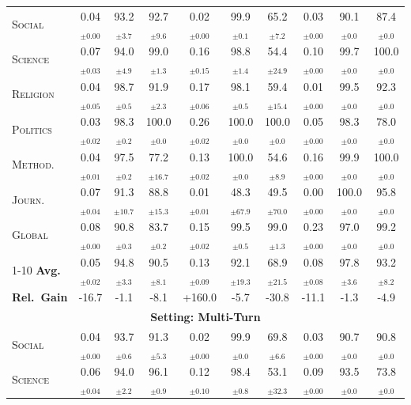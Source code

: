 \begin{table}[!t]
\begin{tabular}{l ccc ccc ccc}
\midrule
\textsc{Social} & 0.04$_{\pm 0.00}$ & 93.2$_{\pm 3.7}$ & 92.7$_{\pm 9.6}$ & 0.02$_{\pm 0.00}$ & 99.9$_{\pm 0.1}$ & 65.2$_{\pm 7.2}$ & 0.03$_{\pm 0.00}$ & 90.1$_{\pm 0.0}$ & 87.4$_{\pm 0.0}$ \\
\textsc{Science} & 0.07$_{\pm 0.03}$ & 94.0$_{\pm 4.9}$ & 99.0$_{\pm 1.3}$ & 0.16$_{\pm 0.15}$ & 98.8$_{\pm 1.4}$ & 54.4$_{\pm 24.9}$ & 0.10$_{\pm 0.00}$ & 99.7$_{\pm 0.0}$ & 100.0$_{\pm 0.0}$ \\
\textsc{Religion} & 0.04$_{\pm 0.05}$ & 98.7$_{\pm 0.5}$ & 91.9$_{\pm 2.3}$ & 0.17$_{\pm 0.06}$ & 98.1$_{\pm 0.5}$ & 59.4$_{\pm 15.4}$ & 0.01$_{\pm 0.00}$ & 99.5$_{\pm 0.0}$ & 92.3$_{\pm 0.0}$ \\
\textsc{Politics} & 0.03$_{\pm 0.02}$ & 98.3$_{\pm 0.2}$ & 100.0$_{\pm 0.0}$ & 0.26$_{\pm 0.02}$ & 100.0$_{\pm 0.0}$ & 100.0$_{\pm 0.0}$ & 0.05$_{\pm 0.00}$ & 98.3$_{\pm 0.0}$ & 78.0$_{\pm 0.0}$ \\
\textsc{Method.} & 0.04$_{\pm 0.01}$ & 97.5$_{\pm 0.2}$ & 77.2$_{\pm 16.7}$ & 0.13$_{\pm 0.02}$ & 100.0$_{\pm 0.0}$ & 54.6$_{\pm 8.9}$ & 0.16$_{\pm 0.00}$ & 99.9$_{\pm 0.0}$ & 100.0$_{\pm 0.0}$ \\
\textsc{Journ.} & 0.07$_{\pm 0.04}$ & 91.3$_{\pm 10.7}$ & 88.8$_{\pm 15.3}$ & 0.01$_{\pm 0.01}$ & 48.3$_{\pm 67.9}$ & 49.5$_{\pm 70.0}$ & 0.00$_{\pm 0.00}$ & 100.0$_{\pm 0.0}$ & 95.8$_{\pm 0.0}$ \\
\textsc{Global} & 0.08$_{\pm 0.00}$ & 90.8$_{\pm 0.3}$ & 83.7$_{\pm 0.2}$ & 0.15$_{\pm 0.02}$ & 99.5$_{\pm 0.5}$ & 99.0$_{\pm 1.3}$ & 0.23$_{\pm 0.00}$ & 97.0$_{\pm 0.0}$ & 99.2$_{\pm 0.0}$ \\
\cmidrule{1-10}
\textbf{Avg.} & 0.05$_{\pm 0.02}$ & 94.8$_{\pm 3.3}$ & 90.5$_{\pm 8.1}$ & 0.13$_{\pm 0.09}$ & 92.1$_{\pm 19.3}$ & 68.9$_{\pm 21.5}$ & 0.08$_{\pm 0.08}$ & 97.8$_{\pm 3.6}$ & 93.2$_{\pm 8.2}$ \\
\rowcolor{gray!10} \textbf{Rel.\ Gain} 
& -16.7 & -1.1 & -8.1
& +160.0 & -5.7 & -30.8
& -11.1 & -1.3 & -4.9 \\
\midrule[\heavyrulewidth]
\multicolumn{10}{c}{\textbf{Setting: Multi-Turn}} \\
\midrule
\textsc{Social} & 0.04$_{\pm 0.00}$ & 93.7$_{\pm 0.6}$ & 91.3$_{\pm 5.3}$ & 0.02$_{\pm 0.00}$ & 99.9$_{\pm 0.0}$ & 69.8$_{\pm 6.6}$ & 0.03$_{\pm 0.00}$ & 90.7$_{\pm 0.0}$ & 90.8$_{\pm 0.0}$ \\
\textsc{Science} & 0.06$_{\pm 0.04}$ & 94.0$_{\pm 2.2}$ & 96.1$_{\pm 0.9}$ & 0.12$_{\pm 0.10}$ & 98.4$_{\pm 0.8}$ & 53.1$_{\pm 32.3}$ & 0.09$_{\pm 0.00}$ & 93.5$_{\pm 0.0}$ & 73.8$_{\pm 0.0}$ \\

\end{tabular}
\end{table}
